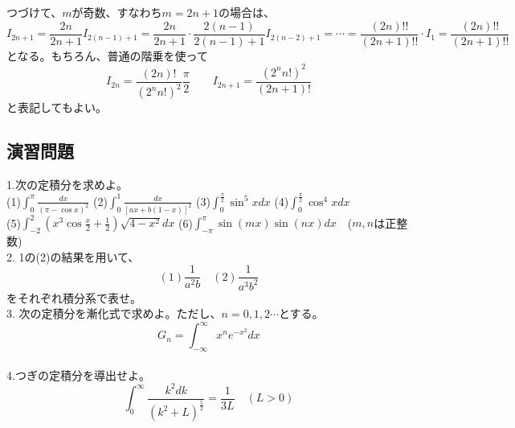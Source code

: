 \documentclass[a4j,dvipdfmx]{jsarticle}
\begin{document}
つづけて、$m$が奇数、すなわち$m=2n+1$の場合は、
\begin{equation*}
    I_{2n+1}=\frac{2n}{2n+1}I_{2(n-1)+1}=\frac{2n}{2n+1}\cdot \frac{2(n-1)}{2(n-1)+1}I_{2(n-2)+1}=\cdots=\frac{(2n)!!}{(2n+1)!!}\cdot I_1=\frac{(2n)!!}{(2n+1)!!}
\end{equation*}
となる。もちろん、普通の階乗を使って
\begin{equation*}
    I_{2n}=\frac{(2n)!}{(2^nn!)^2}\frac{\pi}{2}\qquad I_{2n+1}=\frac{(2^nn!)^2}{(2n+1)!}
\end{equation*}
と表記してもよい。
\newpage
\subsection{演習問題}
1.次の定積分を求めよ。\\

(1)$\displaystyle \int_0^\pi \frac{dx}{(\pi-\cos x)^2}$
\hspace{20mm}
(2)$\displaystyle \int_0^1 \frac{dx}{[ax+b(1-x)]^2}$
\hspace{20mm}
(3)$\displaystyle \int_0^\frac{\pi}{2}\sin^5x dx$
\hspace{20mm}
(4)$\displaystyle \int_0^\frac{\pi}{2}\cos^4x dx$\\

(5)$\displaystyle \int_{-2}^{2}(x^3\cos\frac{x}{2}+\frac{1}{2})\sqrt{4-x^2}dx$
\hspace{-0.5mm}
(6)$\displaystyle \int_{-\pi}^\pi \sin(mx)\sin(nx)dx$　($m,n$は正整数)\\

2. 1の(2)の結果を用いて、
\begin{equation*}
    (1)\frac{1}{a^2b}\quad (2)\frac{1}{a^3b^2}
\end{equation*}
をそれぞれ積分系で表せ。\\

3. 次の定積分を漸化式で求めよ。ただし、$n=0,1,2\cdots$とする。
\begin{equation*}
    G_n=\int_{-\infty}^{\infty} x^n e^{-x^2}dx
\end{equation*}
\\

4.つぎの定積分を導出せよ。
\begin{equation*}
    \int_0^\infty \frac{k^2dk}{(k^2+L)^{\frac{5}{2}}}=\frac{1}{3L}\quad(L>0)
\end{equation*}\\
\end{document}
